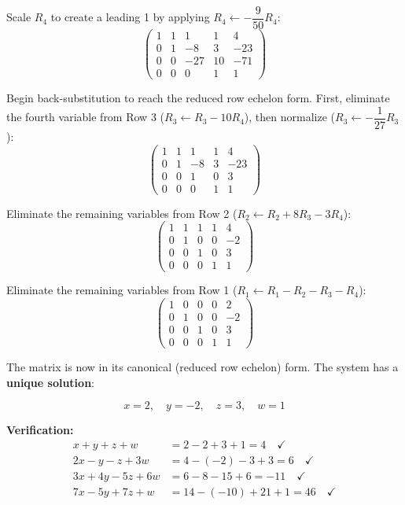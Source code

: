 \documentclass[12pt,a3paper]{article}
\begin{document}
\begin{tcolorbox}[enhanced,breakable,
  colback=cB!4,colframe=cB,boxrule=0.8pt,arc=5pt,
  title={\textbf{Answer --- Solve System via Augmented Matrix}},
  fonttitle=\bfseries\color{white},colbacktitle=cB]
Scale $R_4$ to create a leading 1 by applying $R_4 \leftarrow -\dfrac{9}{50}R_4$:
\[
\left(\begin{array}{rrrr|r}
1 & 1 & 1 & 1 & 4\\
0 & 1 & -8 & 3 & -23\\
0 & 0 & -27 & 10 & -71\\
0 & 0 & 0 & 1 & 1
\end{array}\right)
\]

Begin back-substitution to reach the reduced row echelon form. 
First, eliminate the fourth variable from Row 3 ($R_3 \leftarrow R_3 - 10R_4$), then normalize ($R_3 \leftarrow -\dfrac{1}{27}R_3$):
\[
\left(\begin{array}{rrrr|r}
1 & 1 & 1 & 1 & 4\\
0 & 1 & -8 & 3 & -23\\
0 & 0 & 1 & 0 & 3\\
0 & 0 & 0 & 1 & 1
\end{array}\right)
\]

Eliminate the remaining variables from Row 2 ($R_2 \leftarrow R_2 + 8R_3 - 3R_4$):
\[
\left(\begin{array}{rrrr|r}
1 & 1 & 1 & 1 & 4\\
0 & 1 & 0 & 0 & -2\\
0 & 0 & 1 & 0 & 3\\
0 & 0 & 0 & 1 & 1
\end{array}\right)
\]

Eliminate the remaining variables from Row 1 ($R_1 \leftarrow R_1 - R_2 - R_3 - R_4$):
\[
\left(\begin{array}{rrrr|r}
1 & 0 & 0 & 0 & 2\\
0 & 1 & 0 & 0 & -2\\
0 & 0 & 1 & 0 & 3\\
0 & 0 & 0 & 1 & 1
\end{array}\right)
\]

The matrix is now in its canonical (reduced row echelon) form. The system has a \textbf{unique solution}:

\[
\boxed{x = 2,\quad y = -2,\quad z = 3,\quad w = 1}
\]

\vspace{0.5cm}
\textbf{Verification:}
\begin{align*}
x+y+z+w &= 2 - 2 + 3 + 1 = 4 \quad \checkmark\\
2x-y-z+3w &= 4 - (-2) - 3 + 3 = 6 \quad \checkmark\\
3x+4y-5z+6w &= 6 - 8 - 15 + 6 = -11 \quad \checkmark\\
7x-5y+7z+w &= 14 - (-10) + 21 + 1 = 46 \quad \checkmark
\end{align*}

\end{tcolorbox}
\end{document}
